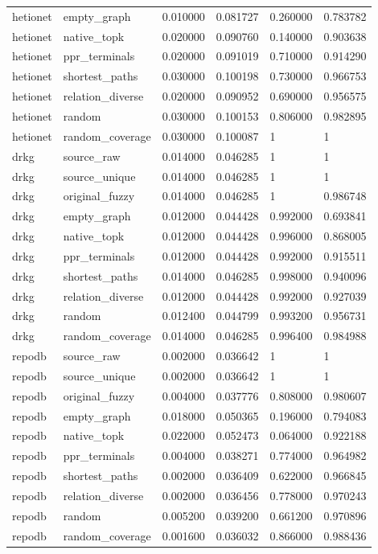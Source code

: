 \begin{tabular}{llllll}
hetionet & empty\_graph & 0.010000 & 0.081727 & 0.260000 & 0.783782 \\
hetionet & native\_topk & 0.020000 & 0.090760 & 0.140000 & 0.903638 \\
hetionet & ppr\_terminals & 0.020000 & 0.091019 & 0.710000 & 0.914290 \\
hetionet & shortest\_paths & 0.030000 & 0.100198 & 0.730000 & 0.966753 \\
hetionet & relation\_diverse & 0.020000 & 0.090952 & 0.690000 & 0.956575 \\
hetionet & random & 0.030000 & 0.100153 & 0.806000 & 0.982895 \\
hetionet & random\_coverage & 0.030000 & 0.100087 & 1 & 1 \\
drkg & source\_raw & 0.014000 & 0.046285 & 1 & 1 \\
drkg & source\_unique & 0.014000 & 0.046285 & 1 & 1 \\
drkg & original\_fuzzy & 0.014000 & 0.046285 & 1 & 0.986748 \\
drkg & empty\_graph & 0.012000 & 0.044428 & 0.992000 & 0.693841 \\
drkg & native\_topk & 0.012000 & 0.044428 & 0.996000 & 0.868005 \\
drkg & ppr\_terminals & 0.012000 & 0.044428 & 0.992000 & 0.915511 \\
drkg & shortest\_paths & 0.014000 & 0.046285 & 0.998000 & 0.940096 \\
drkg & relation\_diverse & 0.012000 & 0.044428 & 0.992000 & 0.927039 \\
drkg & random & 0.012400 & 0.044799 & 0.993200 & 0.956731 \\
drkg & random\_coverage & 0.014000 & 0.046285 & 0.996400 & 0.984988 \\
repodb & source\_raw & 0.002000 & 0.036642 & 1 & 1 \\
repodb & source\_unique & 0.002000 & 0.036642 & 1 & 1 \\
repodb & original\_fuzzy & 0.004000 & 0.037776 & 0.808000 & 0.980607 \\
repodb & empty\_graph & 0.018000 & 0.050365 & 0.196000 & 0.794083 \\
repodb & native\_topk & 0.022000 & 0.052473 & 0.064000 & 0.922188 \\
repodb & ppr\_terminals & 0.004000 & 0.038271 & 0.774000 & 0.964982 \\
repodb & shortest\_paths & 0.002000 & 0.036409 & 0.622000 & 0.966845 \\
repodb & relation\_diverse & 0.002000 & 0.036456 & 0.778000 & 0.970243 \\
repodb & random & 0.005200 & 0.039200 & 0.661200 & 0.970896 \\
repodb & random\_coverage & 0.001600 & 0.036032 & 0.866000 & 0.988436 \\
\hline
\end{tabular}